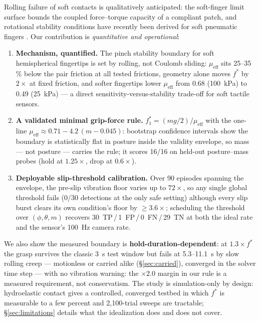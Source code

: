 \documentclass[journal]{IEEEtran}
\newcommand{\mueff}{\mu_{\mathrm{eff}}}
\newcommand{\fstar}{f^{*}}
\begin{document}
Rolling failure of soft contacts is qualitatively anticipated: the
soft-finger limit surface
\cite{goyal1991planar,kao1992quasistatic,xydas1999modeling} bounds the
coupled force--torque capacity of a compliant patch, and rotational
stability conditions have recently been derived for soft pneumatic fingers
\cite{jang2024rotational}. Our contribution is \emph{quantitative and
operational}:
\begin{enumerate}
  \item \textbf{Mechanism, quantified.} The pinch stability boundary for
    soft hemispherical fingertips is set by rolling, not Coulomb sliding:
    $\mueff$ sits 25--35\,\% below the pair friction at all tested
    frictions, geometry alone moves $\fstar$ by $2\times$ at fixed
    friction, and softer fingertips lower $\mueff$ from 0.68 (100~kPa) to
    0.49 (25~kPa) --- a direct sensitivity-versus-stability trade-off for
    soft tactile sensors.
  \item \textbf{A validated minimal grip-force rule.}
    $f_1^{*} = (mg/2)/\mueff$ with the one-line
    $\mueff \approx 0.71 - 4.2\,(m-0.045)$: bootstrap confidence intervals
    show the boundary is statistically flat in posture inside the validity
    envelope, so mass --- not posture --- carries the rule; it scores
    16/16 on held-out posture--mass probes (hold at $1.25\times$, drop at
    $0.6\times$).
  \item \textbf{Deployable slip-threshold calibration.} Over 90 episodes
    spanning the envelope, the pre-slip vibration floor varies up to
    $72\times$, so any single global threshold fails (0/30 detections at
    the only safe setting) although every slip burst clears its own
    condition's floor by ${\ge}3.6\times$; scheduling the threshold over
    $(\phi,\theta,m)$ recovers 30~TP\,/\,1~FP\,/\,0~FN\,/\,29~TN at both
    the ideal rate and the sensor's 100~Hz camera rate.
\end{enumerate}

We also show the measured boundary is \textbf{hold-duration-dependent}: at
$1.3\times\fstar$ the grasp survives the classic 3~s test window but fails
at 5.3--11.1~s by slow rolling creep --- motionless or carried alike
(\S\ref{sec:carried}), converged in the solver time step --- with no
vibration warning: the $\times 2.0$ margin in our rule is a measured
requirement, not conservatism. The study is simulation-only by design:
hydroelastic contact gives a controlled, converged testbed in which
$\fstar$ is measurable to a few percent and 2{,}100-trial sweeps are
tractable; \S\ref{sec:limitations} details what the idealization does and
does not cover.
\end{document}
